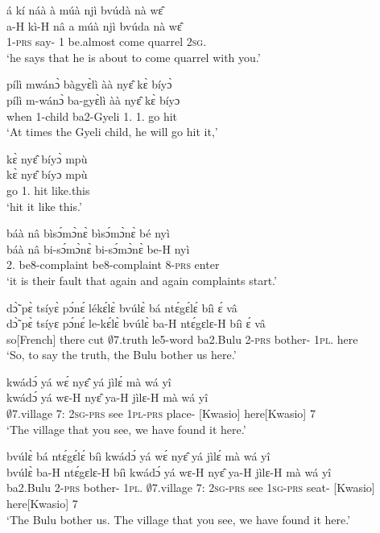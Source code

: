 \begin{exe}[(C234)]
\exC\label{124}
  \glll  á kí náà à múà njì bvúdà nà wɛ̂ \\
       a-H kì-H nâ a múà njì bvúda nà wɛ̂ \\
         1-\textsc{prs} say-{\R} {\COMP} 1 be.almost come quarrel {\COM} 2\textsc{sg}.{\OBJ}   \\
    \trans `he says that he is about to come quarrel with you.'
 
\exC\label{125} 
  \glll  pílì mwánɔ̀ bàgyɛ̀lì àà nyɛ̂ kɛ̀ bíyɔ̀ \\
       pílì m-wánɔ̀ ba-gyɛ̀lì àà nyɛ̂ kɛ̀ bíyɔ\\
          when {\N}1-child ba2-Gyeli 1.{\FUT} 1.{\OBJ} go hit  \\
    \trans `At times the Gyeli child, he will go hit it,'
 
\exC\label{126} 
  \glll  kɛ̀ nyɛ̂ bíyɔ̀ mpù \\
         kɛ̀ nyɛ̂ bíyɔ mpù \\
          go 1.{\OBJ} hit like.this  \\
    \trans `hit it like this.'
 
\exC\label{127} 
  \glll  báà nâ bìsɔ́mɔ̀nɛ̀ bìsɔ́mɔ̀nɛ̀ bé nyì \\
        báà nâ bi-sɔ́mɔ̀nɛ̀ bi-sɔ́mɔ̀nɛ̀ be-H nyì \\
         2.{\COP} {\COMP} be8-complaint be8-complaint 8-\textsc{prs} enter   \\
    \trans `it is their fault that again and again complaints start.'
 
\exC\label{128}
  \glll  dɔ̃̀ pɛ̀ tsíyɛ̀ pɔ́nɛ́ lékɛ́lɛ̀ bvúlɛ̀ bá ntɛ́gɛ́lɛ́ bíì ɛ́ vâ \\
         dɔ̃̀ pɛ̀ tsíyɛ pɔ́nɛ́ le-kɛ́lɛ̀ bvúlɛ̀ ba-H ntɛ́gɛlɛ-H bíì ɛ́ vâ \\
         so[French] there cut $\emptyset$7.truth le5-word ba2.Bulu 2-\textsc{prs} bother-{\R} 1\textsc{pl}.{\OBJ} {\LOC} here   \\
    \trans `So, to say the truth, the Bulu bother us here.'
 
 \largerpage
\exC\label{129}
  \glll kwádɔ́ yá wɛ́ nyɛ̂ yá jìlɛ́ mà wá yî \\
          kwádɔ́ yá wɛ-H nyɛ̂ ya-H jìlɛ-H mà wá yî \\
         $\emptyset$7.village 7:{\ATT}  2\textsc{sg}-\textsc{prs} see 1\textsc{pl}-\textsc{prs} place-{\R} {\COMPL}[Kwasio] here[Kwasio] 7   \\
    \trans `The village that you see, we have found it here.'
 
\exC\label{130}
  \glll bvúlɛ̀ bá ntɛ́gɛ́lɛ́ bíì kwádɔ́ yá wɛ́ nyɛ̂ yá jìlɛ́ mà wá yî \\
        bvúlɛ̀ ba-H ntɛ́gɛlɛ-H bíì kwádɔ́ yá wɛ-H nyɛ̂ ya-H jìlɛ-H mà wá yî \\
          ba2.Bulu 2-\textsc{prs} bother-{\R} 1\textsc{pl}.{\OBJ} $\emptyset$7.village 7:{\ATT}  2\textsc{sg}-\textsc{prs} see 1\textsc{sg}-\textsc{prs} seat-{\R} {\COMPL}[Kwasio] here[Kwasio] 7  \\
    \trans `The Bulu bother us. The village that you see, we have found it  here.'
\end{exe}

